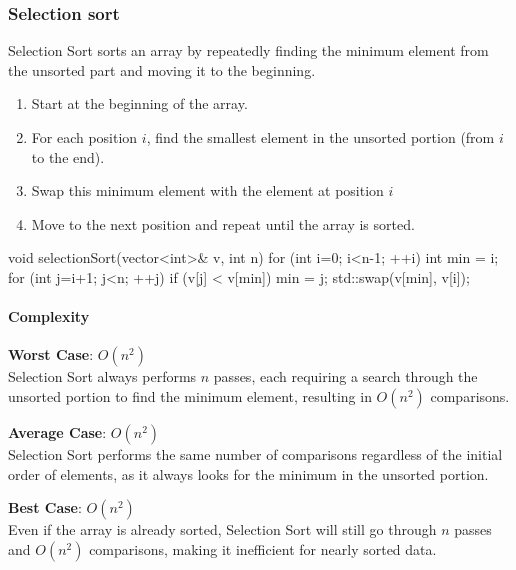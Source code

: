 \documentclass{report}
\begin{document}
\pagebreak 
\subsubsection{Selection sort}
\bigbreak \noindent 
Selection Sort sorts an array by repeatedly finding the minimum element from the unsorted part and moving it to the beginning.
\begin{enumerate}
    \item Start at the beginning of the array.
    \item For each position $i$, find the smallest element in the unsorted portion (from $i$ to the end).
    \item Swap this minimum element with the element at position $i$
    \item Move to the next position and repeat until the array is sorted.
\end{enumerate}
\bigbreak \noindent 
\begin{cppcode}
    void selectionSort(vector<int>& v, int n) {
        for (int i=0; i<n-1; ++i) {
            int min = i;
            for (int j=i+1; j<n; ++j) {
                if (v[j] < v[min]) {
                    min = j;
                }
            }
            std::swap(v[min], v[i]);
        }
    }
\end{cppcode}
\bigbreak \noindent 
\paragraph{Complexity}
\bigbreak \noindent \bigbreak \noindent 
\textbf{Worst Case}: \( O(n^2) \) \\
\bigbreak \noindent 
Selection Sort always performs \( n \) passes, each requiring a search through the unsorted portion to find the minimum element, resulting in \( O(n^2) \) comparisons.

\bigbreak \noindent 
\textbf{Average Case}: \( O(n^2) \) \\
\bigbreak \noindent 
Selection Sort performs the same number of comparisons regardless of the initial order of elements, as it always looks for the minimum in the unsorted portion.

\bigbreak \noindent 
\textbf{Best Case}: \( O(n^2) \) \\
\bigbreak \noindent 
Even if the array is already sorted, Selection Sort will still go through \( n \) passes and \( O(n^2) \) comparisons, making it inefficient for nearly sorted data.


\pagebreak 
\end{document}
